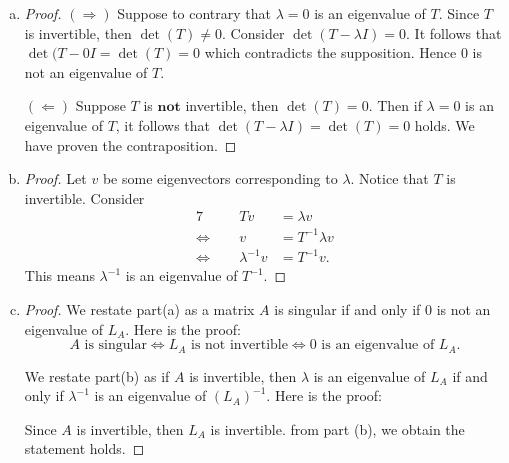 \begin{Exercise}
\begin{enumerate}[(a)]
\item
\begin{proof}
$(\Longrightarrow)$
Suppose to contrary that $\lambda = 0$ is an eigenvalue of $T$. Since $T$ is invertible, then $\det(T) \neq 0$. Consider  $\det(T-\lambda I) = 0$. It follows that $\det(T- 0 I = \det(T) = 0$ which contradicts the supposition. Hence $0$ is not an eigenvalue of $T$.

\vspace{2ex}

$(\Longleftarrow)$
Suppose $T$ is $\mathbf{not}$ invertible, then $\det(T) = 0$. Then if $\lambda = 0$ is an eigenvalue of $T$, it follows that $\det(T-\lambda I) = \det(T) = 0$ holds. We have proven the contraposition.
\end{proof}

\item
\begin{proof}
Let $v$ be some eigenvectors corresponding to $\lambda$. Notice that $T$ is invertible. Consider
\begin{alignat*}{7}
\quad&& T v &= \lambda v \\
\iff&& v &= T^{-1} \lambda v \\
\iff&& \lambda^{-1} v &= T^{-1} v.
\end{alignat*}
This means $\lambda^{-1}$ is an eigenvalue of $T^{-1}$.
\end{proof}

\item
\begin{proof}
We restate part(a) as a matrix $A$ is singular if and only if $0$ is not an eigenvalue of $L_A$. Here is the proof:
$$
A\text{ is singular}
\iff L_A\text{ is not invertible}
\iff 0\text{ is an eigenvalue of } L_A.
$$

We restate part(b) as if $A$ is invertible, then $\lambda$ is an eigenvalue of $L_A$ if and only if $\lambda^{-1}$ is an eigenvalue of $(L_A)^{-1}$. Here is the proof:

Since $A$ is invertible, then $L_A$ is invertible. from part (b), we obtain the statement holds.
\end{proof}
\end{enumerate}
\end{Exercise}